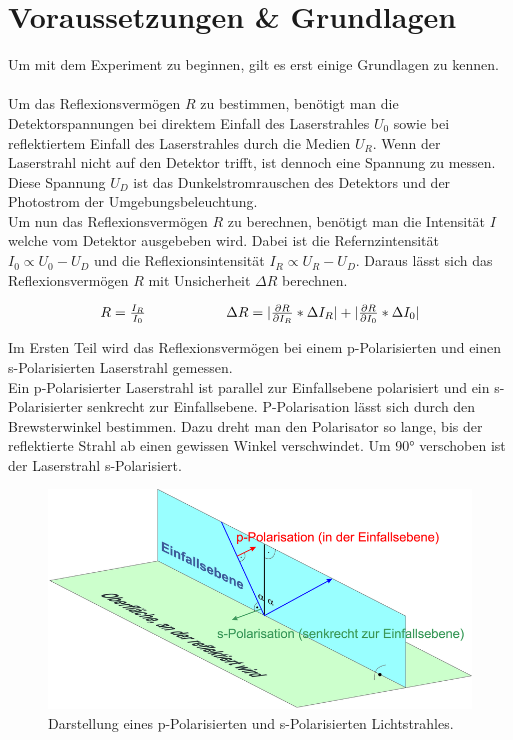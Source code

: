 \documentclass[12pt,a4paper,twoside]{article}
\begin{document}
\section{Voraussetzungen \& Grundlagen} %
Um mit dem Experiment zu beginnen, gilt es erst einige Grundlagen zu kennen. 
\\
\\
Um das Reflexionsvermögen $R$ zu bestimmen, benötigt man die Detektorspannungen bei direktem Einfall des Laserstrahles $U_0$ sowie bei reflektiertem Einfall des Laserstrahles durch die Medien $U_R$. 
Wenn der Laserstrahl nicht auf den Detektor trifft, ist dennoch eine Spannung zu messen. Diese Spannung $U_D$ ist das Dunkelstromrauschen des Detektors und der Photostrom der Umgebungsbeleuchtung. 
\\
Um nun das Reflexionsvermögen $R$ zu berechnen, benötigt man die Intensität $I$ welche vom Detektor ausgebeben wird. 
Dabei ist die Refernzintensität $I_0 \varpropto U_0 - U_D$ und die Reflexionsintensität $I_R \varpropto U_R - U_D$. 
Daraus lässt sich das Reflexionsvermögen $R$ mit Unsicherheit $\Delta R$ berechnen. 

\begin{equation}
    \label{eq:Reflexionsvermögen}
    \centerline{$R=\frac{I_R}{I_0}$ \\ $\Delta R = \vert \frac{\partial R}{\partial I_R} * \Delta I_R \vert + \vert \frac{\partial R}{\partial I_0} * \Delta I_0 \vert$}
\end{equation}

\noindent
Im Ersten Teil wird das Reflexionsvermögen bei einem p-Polarisierten und einen s-Polarisierten Laserstrahl gemessen. 
\\
Ein p-Polarisierter Laserstrahl ist parallel zur Einfallsebene polarisiert und ein s-Polarisierter senkrecht zur Einfallsebene. 
P-Polarisation lässt sich durch den Brewsterwinkel bestimmen. Dazu dreht man den Polarisator so lange, bis der reflektierte Strahl ab einen gewissen Winkel verschwindet. 
Um 90° verschoben ist der Laserstrahl s-Polarisiert. 

\begin{figure}[H]
    \centering
    \includegraphics[width=0.6\linewidth]{nudes/sp pol.png}
    \caption{Darstellung eines p-Polarisierten und s-Polarisierten Lichtstrahles. \cite{Polarisation}}
    \label{fig:s-p-Polarisiert}
\end{figure}
\end{document}
